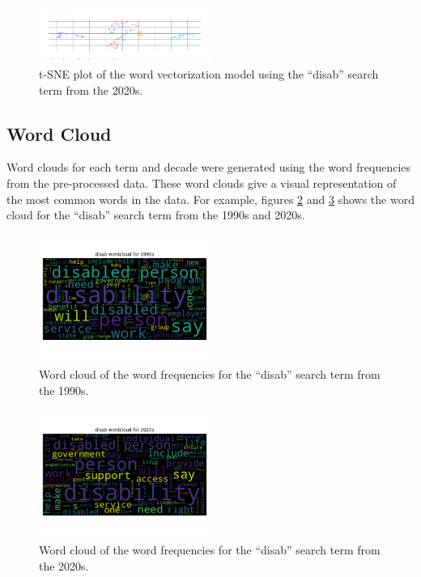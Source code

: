\documentclass[11pt,a4paper, twocolumn]{article}
\begin{document}
\begin{figure}
  \centering
  \includegraphics[width=0.5\textwidth]{lemma_disab_2020_simword.png}
  \caption{\label{tsneb} t-SNE plot of the word vectorization model using the ``disab'' search term from the 2020s.}
  
\end{figure}

\subsection{Word Cloud}

Word clouds for each term and decade were generated using the word frequencies from the pre-processed data. These word clouds give a visual representation of the most common words in the data. For example, figures \ref{wca} and \ref{wcb} shows the word cloud for the ``disab'' search term from the 1990s and 2020s.

\begin{figure}
  \centering
  \includegraphics[width=0.5\textwidth]{lemma_disab_1990_wordcloud.png}
  \caption{\label{wca} Word cloud of the word frequencies for the ``disab'' search term from the 1990s.}
\end{figure}

\begin{figure}
  \centering
  \includegraphics[width=0.5\textwidth]{lemma_disab_2020_wordcloud.png}
  \caption{\label{wcb} Word cloud of the word frequencies for the ``disab'' search term from the 2020s.}
\end{figure}
\end{document}
